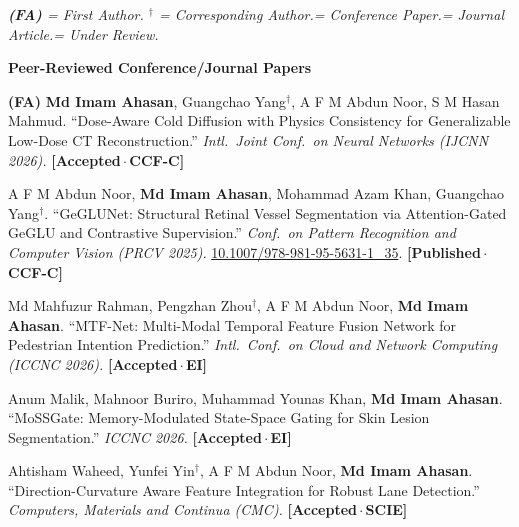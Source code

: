 \documentclass[11pt,a4paper]{article}
\newcommand{\pubsub}[1]{\vspace{4pt}\textbf{#1}\vspace{1pt}}
\begin{document}
{\small\color{SoftGray}\textit{%
  \textbf{(FA)} = First Author.\enspace
  ${}^\dagger$ = Corresponding Author.\enspace
  [C] = Conference Paper.\enspace
  [J] = Journal Article.\enspace
  [R] = Under Review.\enspace
}}

\pubsub{Peer-Reviewed Conference/Journal Papers}

\begin{description}[leftmargin=3.0em, labelwidth=2.6em, labelsep=0.4em,
                    itemsep=5pt, topsep=2pt, parsep=0pt]

\item[{\textbf{[C1]}}] \textbf{(FA)} \textbf{Md Imam Ahasan}, Guangchao Yang$^\dagger$,
  A F M Abdun Noor, S M Hasan Mahmud.
  ``Dose-Aware Cold Diffusion with Physics Consistency for Generalizable Low-Dose CT
  Reconstruction.'' \textit{Intl.\ Joint Conf.\ on Neural Networks (IJCNN 2026).}
  \textbf{[Accepted\,$\cdot$\,CCF-C]}

\item[{\textbf{[C2]}}] A F M Abdun Noor, \textbf{Md Imam Ahasan},
  Mohammad Azam Khan, Guangchao Yang$^\dagger$.
  ``GeGLUNet: Structural Retinal Vessel Segmentation via Attention-Gated GeGLU and
  Contrastive Supervision.'' \textit{Conf.\ on Pattern Recognition and Computer Vision
  (PRCV 2025).}
  \href{https://doi.org/10.1007/978-981-95-5631-1_35}%
       {\small 10.1007/978-981-95-5631-1\_35}.
  \textbf{[Published\,$\cdot$\,CCF-C]}

\item[{\textbf{[C3]}}] Md Mahfuzur Rahman, Pengzhan Zhou$^\dagger$,
  A F M Abdun Noor, \textbf{Md Imam Ahasan}.
  ``MTF-Net: Multi-Modal Temporal Feature Fusion Network for Pedestrian Intention
  Prediction.'' \textit{Intl.\ Conf.\ on Cloud and Network Computing (ICCNC 2026).}
  \textbf{[Accepted\,$\cdot$\,EI]}

\item[{\textbf{[C4]}}] Anum Malik, Mahnoor Buriro, Muhammad Younas Khan,
  \textbf{Md Imam Ahasan}.
  ``MoSSGate: Memory-Modulated State-Space Gating for Skin Lesion Segmentation.''
  \textit{ICCNC 2026.} \textbf{[Accepted\,$\cdot$\,EI]}

\item[{\textbf{[J1]}}] Ahtisham Waheed, Yunfei Yin$^\dagger$,
  A F M Abdun Noor, \textbf{Md Imam Ahasan}.
  ``Direction-Curvature Aware Feature Integration for Robust Lane Detection.''
  \textit{Computers, Materials and Continua (CMC).} \textbf{[Accepted\,$\cdot$\,SCIE]}

\end{description}
\end{document}
